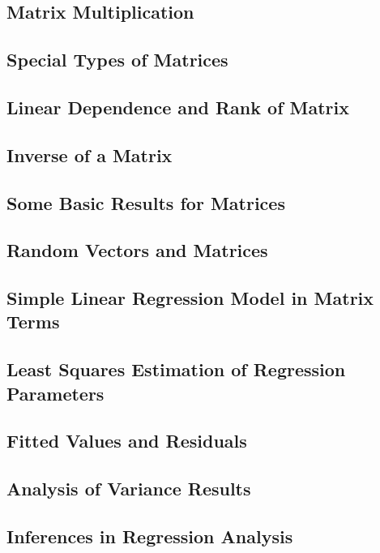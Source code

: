 \subsection{Matrix Multiplication}

\subsection{Special Types of Matrices}

\subsection{Linear Dependence and Rank of Matrix}

\subsection{Inverse of a Matrix}

\subsection{Some Basic Results for Matrices}

\subsection{Random Vectors and Matrices}

\subsection{Simple Linear Regression Model in Matrix Terms}

\subsection{Least Squares Estimation of Regression Parameters}

\subsection{Fitted Values and Residuals}

\subsection{Analysis of Variance Results}

\subsection{Inferences in Regression Analysis}

